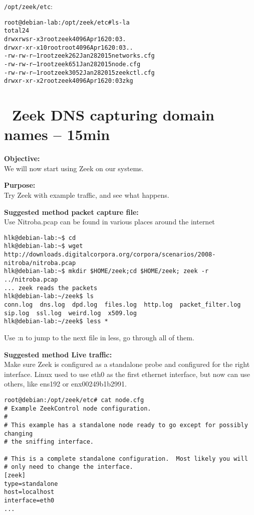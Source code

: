 \documentclass[a4paper,11pt,notitlepage]{report}
\begin{document}
\verb+/opt/zeek/etc+:
\begin{alltt}
root@debian-lab:/opt/zeek/etc# ls -la
total 24
drwxrwsr-x  3 root zeek 4096 Apr 16 20:03 .
drwxr-xr-x 10 root root 4096 Apr 16 20:03 ..
-rw-rw-r--  1 root zeek  262 Jan 28  2015 networks.cfg
-rw-rw-r--  1 root zeek  651 Jan 28  2015 node.cfg
-rw-rw-r--  1 root zeek 3052 Jan 28  2015 zeekctl.cfg
drwxr-xr-x  2 root zeek 4096 Apr 16 20:03 zkg
\end{alltt}


\chapter{\faExclamationTriangle\ Zeek DNS capturing domain names -- 15min}
\label{ex:zeekdnsbasic}


{\bf Objective:} \\
We will now start using Zeek on our systems.


{\bf Purpose:}\\
Try Zeek with example traffic, and see what happens.


{\bf Suggested method packet capture file:}\\
Use Nitroba.pcap can be found in various places around the internet

\begin{verbatim}
hlk@debian-lab:~$ cd
hlk@debian-lab:~$ wget http://downloads.digitalcorpora.org/corpora/scenarios/2008-nitroba/nitroba.pcap
hlk@debian-lab:~$ mkdir $HOME/zeek;cd $HOME/zeek; zeek -r ../nitroba.pcap
... zeek reads the packets
hlk@debian-lab:~/zeek$ ls
conn.log  dns.log  dpd.log  files.log  http.log  packet_filter.log
sip.log  ssl.log  weird.log  x509.log
hlk@debian-lab:~/zeek$ less *
\end{verbatim}

Use :n to jump to the next file in less, go through all of them.

{\bf Suggested method Live traffic:}\\
Make sure Zeek is configured as a standalone probe and configured for the right interface. Linux used to use eth0 as the first ethernet interface, but now can use others, like ens192 or enx00249b1b2991.

\begin{verbatim}
root@debian:/opt/zeek/etc# cat node.cfg
# Example ZeekControl node configuration.
#
# This example has a standalone node ready to go except for possibly changing
# the sniffing interface.

# This is a complete standalone configuration.  Most likely you will
# only need to change the interface.
[zeek]
type=standalone
host=localhost
interface=eth0
...
\end{verbatim}
\end{document}
